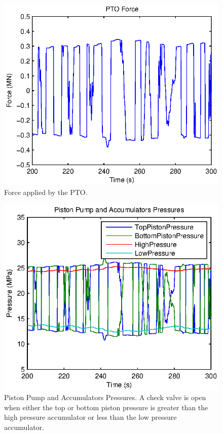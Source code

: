 \documentclass[conference]{IEEEtran}
\begin{document}
\begin{figure}[t]
    \centering
    \includegraphics[width=1\columnwidth]{Images/ptoForce}
    \caption{Force applied by the PTO.}
    \end{figure}

\begin{figure}[t]
    \centering
    \includegraphics[width=1\columnwidth]{Images/Pressures}
    \caption{Piston Pump and Accumulators Pressures. A check valve is open when either the top or bottom piston pressure is greater than the high pressure accumulator or less than the low pressure accumulator.}
    \end{figure}
\end{document}
